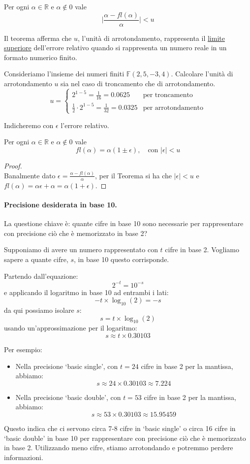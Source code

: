 \documentclass{article}
\begin{document}
\begin{theorem}
   Per ogni $\alpha\in \mathbb{R}$ e $\alpha\notin0$ vale
   $$\Big\lvert \frac{\alpha-fl(\alpha)}{\alpha}\Big\rvert<u$$
\end{theorem}
Il teorema afferma che $u$, l'unità di arrotondamento, rappresenta il
\underline{limite superiore} dell'errore relativo quando si rappresenta 
un numero reale in un formato numerico finito.
\begin{example}
    Consideriamo l'insieme dei numeri finiti $\mathbb{F}(2,5,-3,4)$. Calcolare l'unità di arrotondamento $u$ sia nel caso di troncamento che di
    arrotondamento.
    $$u=\begin{cases}
        2^{1-5}=\frac{1}{16}=0.0625 & \text{per
        troncamento} \\
        \frac{1}{2}\cdot2^{1-5}=\frac{1}{32}=0.0325 & \text{per arrotondamento}
    \end{cases}$$
\end{example}
Indicheremo con $\epsilon$ l'errore relativo.
\begin{corollary}
    Per ogni $\alpha\in \mathbb{R}$ e $\alpha\notin0$ vale 
    $$  fl(\alpha)=\alpha(1\pm\epsilon),\quad \text{con }\lvert 
      \epsilon\rvert<u $$
\end{corollary} 
\begin{proof}\leavevmode\\
    Banalmente dato $\epsilon=\frac{\alpha-fl(\alpha)}{\alpha}$,
    per il Teorema si ha che $\lvert \epsilon\rvert<u$ e
    $fl(\alpha)=\alpha\epsilon+\alpha=\alpha(1+\epsilon)$.
\end{proof}
\paragraph{Precisione desiderata in base 10.}
La questione chiave è: quante cifre in base 10 sono necessarie per
rappresentare con precisione ciò che è memorizzato in base 2? 

Supponiamo di avere un numero rappresentato con $t$ cifre in base 2. Vogliamo
sapere a quante cifre, $s$, in base 10 questo corrisponde.

Partendo dall'equazione:
$$2^{-t}=10^{-s}$$
e applicando il logaritmo in base 10 ad entrambi i lati:
$$-t\times\log_{10}(2)=-s$$
da qui possiamo isolare $s$:
$$s=t\times\log_{10}(2)$$
usando un'approssimazione per il logaritmo:
$$s \approx t \times 0.30103$$

Per esempio:
\begin{itemize}
\item Nella precisione `basic single', con \( t = 24 \) cifre in base 2 per la mantissa, abbiamo:
$$s \approx 24 \times 0.30103 \approx 7.224$$
\item Nella precisione `basic double', con \( t = 53 \) cifre in base 2 per la mantissa, abbiamo:
$$s \approx 53 \times 0.30103 \approx 15.95459$$
\end{itemize}
Questo indica che ci servono circa 7-8 cifre in `basic single' o circa 16
cifre in `basic double' in base 10 per rappresentare con
precisione ciò che è memorizzato in base 2. Utilizzando meno cifre, stiamo
arrotondando e potremmo perdere informazioni.
\end{document}
